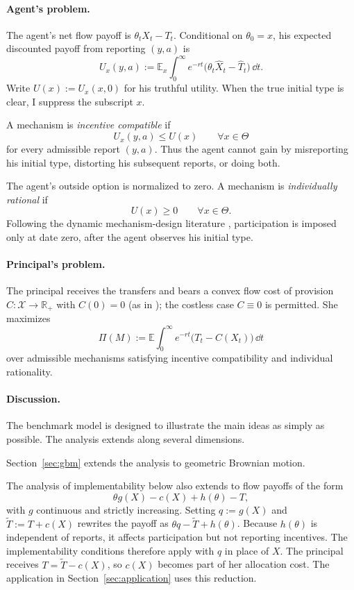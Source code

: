 \documentclass[12pt]{article}
\newcommand{\E}{\mathbb{E}}
\begin{document}
\paragraph{Agent's problem.}
The agent's net flow payoff is \(\theta_tX_t-T_t\). Conditional on
\(\theta_0=x\), his expected discounted payoff from reporting \((y,a)\)
is
\[
  U_x(y,a)
  :=
  \E_x\int_0^\infty e^{-rt}
  \bigl(\theta_t\widehat X_t-\widehat T_t\bigr)\,\dd t.
\]
Write \(U(x):=U_x(x,0)\) for his truthful utility. When the true initial
type is clear, I suppress the subscript \(x\).

A mechanism is \emph{incentive compatible} if
\[
  U_x(y,a)\leq U(x)
  \qquad\forall x\in\Theta
\]
for every admissible report \((y,a)\). Thus the agent cannot gain by
misreporting his initial type, distorting his subsequent reports, or
doing both.

The agent's outside option is normalized to zero. A mechanism is
\emph{individually rational} if
\[
  U(x)\geq0
  \qquad\forall x\in\Theta.
\]
Following the dynamic mechanism-design literature
\citep{pavan2014dynamic,bergemann2015dynamic}, participation is imposed
only at date zero, after the agent observes his initial type.

\paragraph{Principal's problem.}
The principal receives the transfers and bears a convex flow cost of
provision \(C\colon\mathcal X\to\mathbb R_+\) with \(C(0)=0\)
(as in \cite{mussa1978monopoly}); the costless case \(C\equiv0\) is permitted.
She maximizes
\[
  \Pi(M)
  :=
  \E\int_0^\infty e^{-rt}\bigl(T_t-C(X_t)\bigr)\,\dd t
\]
over admissible mechanisms satisfying incentive compatibility and
individual rationality.

\paragraph{Discussion.}
The benchmark model is designed to illustrate the main ideas as
simply as possible. The analysis extends along several dimensions.

Section~\ref{sec:gbm} extends the analysis to geometric Brownian
motion.

The analysis of implementability below also extends to flow payoffs
of the form
\[
  \theta g(X)-c(X)+h(\theta)-T,
\]
with \(g\) continuous and strictly increasing. Setting \(q:=g(X)\)
and \(\widetilde T:=T+c(X)\) rewrites the payoff as
\(\theta q-\widetilde T+h(\theta)\). Because \(h(\theta)\) is
independent of reports, it affects participation but not reporting
incentives. The implementability conditions therefore apply with
\(q\) in place of \(X\). The principal receives
\(T=\widetilde T-c(X)\), so \(c(X)\) becomes part of her allocation
cost. The application in Section~\ref{sec:application} uses this
reduction.
\end{document}
